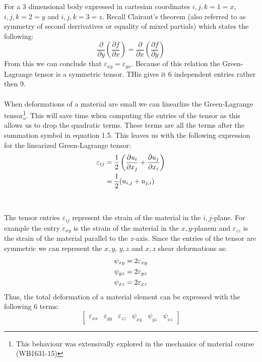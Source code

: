 \documentclass[11pt, a4paper]{article}
\renewcommand*{\epsilon}{\varepsilon}
\numberwithin{equation}{section}
\numberwithin{figure}{section}
\begin{document}
For a 3 dimensional body expressed in cartesian coordinates $i,j,k=1=x$, $i,j,k=2=y$ and $i,j,k=3=z$. Recall  Clairaut's theorem (also referred to as symmetry of second derrivatives or equality of mixed partials) which states the following:
\begin{equation}
  \frac{\partial}{\partial y} \left(\frac{\partial f}{\partial x}\right) = \frac{\partial}{\partial x} \left(\frac{\partial f}{\partial y}\right)
\end{equation}
From this we can conclude that $\epsilon_{xy} = \epsilon_{yx}$. Because of this relation the Green-Lagrange tensor is a symmetric tensor. THis gives it 6 independent entries rather then 9.\\
\\
When deformations of a material are small we can linearlize the Green-Lagrange tensor\footnote{This behaviour was extensivally explored in the mechanics of material course (WB1631-15)}. This will save time when computing the entries of the tensor as this allows us to drop the quadratic terms. These terms are all the terms after the summation symbol in equation 1.5. This leaves us with the following expression for the linearized Green-Lagrange tensor:
\begin{align}
  \epsilon_{ij} &= \frac{1}{2} \left( \frac{\partial u_i}{\partial x_j} + \frac{\partial u_j}{\partial x_i} \right) \notag\\
  &= \frac{1}{2}(u_{i,j} + u_{j,i})
\end{align}\\
\\
The tensor entries $\epsilon_{ij}$ represent the strain of the material in the $i,j$-plane. For example the entry $\epsilon_{xy}$ is the strain of the material in the $x,y$-planem and $\epsilon_{zz}$ is the strain of the material parallel to the $z$-axis. Since the entries of the tensor are symmetric we can represent the $x,y$, $y,z$ and $x,z$ shear deformations as:
\begin{gather}
  \psi_{xy} = 2\epsilon_{xy}\notag\\
  \psi_{yz} = 2\epsilon_{yz}\notag\\
  \psi_{xz} = 2\epsilon_{xz}
\end{gather}
Thus, the total deformation of a material element can be expressed with the following 6 terms:
\begin{equation}
  \begin{bmatrix}
    \epsilon_{xx} & \epsilon_{yy} & \epsilon_{zz} & \psi_{xy} & \psi_{yz} & \psi_{xz}
  \end{bmatrix}
\end{equation}
\end{document}
